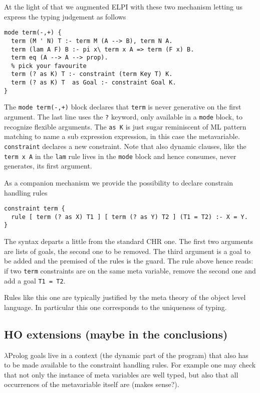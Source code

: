 \documentclass[preprint]{sigplanconf}
\begin{document}
At the light of that we augmented ELPI with these two mechanism letting us
express the typing judgement as follows

\begin{verbatim}
mode term(-,+) {
  term (M ' N) T :- term M (A --> B), term N A.
  term (lam A F) B :- pi x\ term x A => term (F x) B.
  term eq (A --> A --> prop).
  % pick your favourite
  term (? as K) T :- constraint (term Key T) K.
  term (? as K) T  as Goal :- constraint Goal K.
}
\end{verbatim}

The \verb/mode term(-,+)/ block declares that \verb+term+
is never generative on the first argument.  The last line uses the \verb+?+
keyword, only available in a \verb+mode+ block, to recognize
flexible arguments.  The \verb+as K+ is just sugar reminiscent of ML
pattern matching to name a sub expression expression, in this case
the metavariable.  \verb+constraint+ declares a new constraint.
Note that also dynamic clauses, like the \verb+term x A+ in the
\verb+lam+ rule lives in the \verb+mode+ block and hence
consumes, never generates, its first argument.

As a companion mechanism we provide the possibility to declare constrain
handling rules

\begin{verbatim}
constraint term {
  rule [ term (? as X) T1 ] [ term (? as Y) T2 ] (T1 = T2) :- X = Y.
}
\end{verbatim}

The syntax departs a little from the standard CHR one.  The first two
arguments are lists of goals, the second one to be removed.  The third argument
is a goal to be added and the premised of the rules is the guard. The rule
above hence reads: if two \verb+term+ constraints are on the same meta variable,
remove the second one and add a goal \verb+T1 = T2+.

Rules like this one are typically justified by the meta theory of the
object level language.  In particular this one corresponds to the uniqueness
of typing.

\subsection{HO extensions (maybe in the conclusions)}

$\lambda$Prolog goals live in a context (the dynamic part of the program)
that also has to be made available to
the constraint handling rules.  For example one may check that not only the
instance of meta variables are well typed, but also that all occurrences of the
metavariable itself are (makes sense?).
\end{document}
